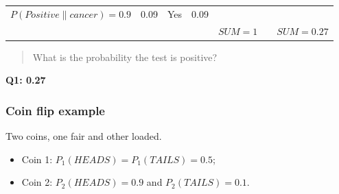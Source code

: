 \documentclass[]{book}
\providecommand{\tightlist}{%
  \setlength{\itemsep}{0pt}\setlength{\parskip}{0pt}}
\begin{document}
\begin{longtable}[]{@{}ccccccc@{}}
\begin{minipage}[t]{0.04\columnwidth}
\(P(Positive\| cancer) = 0.9\)\strut
\end{minipage} & \begin{minipage}[t]{0.04\columnwidth}\centering\strut
0.09\strut
\end{minipage} & \begin{minipage}[t]{0.04\columnwidth}\centering\strut
Yes\strut
\end{minipage} & \begin{minipage}[t]{0.04\columnwidth}\centering\strut
0.09\strut
\end{minipage}\tabularnewline
\begin{minipage}[t]{0.04\columnwidth}\centering\strut
\strut
\end{minipage} & \begin{minipage}[t]{0.04\columnwidth}\centering\strut
\strut
\end{minipage} & \begin{minipage}[t]{0.04\columnwidth}\centering\strut
\strut
\end{minipage} & \begin{minipage}[t]{0.04\columnwidth}\centering\strut
\strut
\end{minipage} & \begin{minipage}[t]{0.04\columnwidth}\centering\strut
\(SUM = 1\)\strut
\end{minipage} & \begin{minipage}[t]{0.04\columnwidth}\centering\strut
\strut
\end{minipage} & \begin{minipage}[t]{0.04\columnwidth}\centering\strut
\(SUM = 0.27\)\strut
\end{minipage}\tabularnewline
\bottomrule
\end{longtable}

\begin{quote}
What is the probability the test is positive?
\end{quote}

\textbf{Q1: 0.27}

\subsubsection{Coin flip example}\label{coin-flip-example}

Two coins, one fair and other loaded.

\begin{itemize}
\tightlist
\item
  Coin 1: \(P_1(HEADS) = P_1(TAILS) = 0.5\);
\item
  Coin 2: \(P_2(HEADS) = 0.9\) and \(P_2(TAILS) = 0.1\).
\end{itemize}
\end{document}
